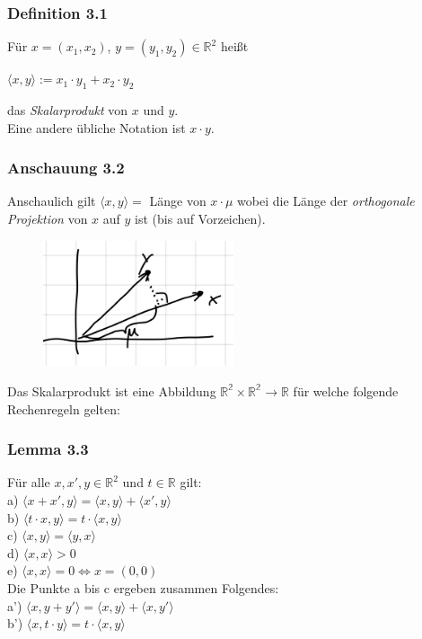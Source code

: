 \documentclass{article}
\begin{document}
\subsubsection*{Definition 3.1}
Für $x=(x_1, x_2)$, $y=(y_1, y_2) \in \mathbb{R}^2$ heißt \\
\begin{center}
    $\langle x,y \rangle := x_1 \cdot y_1 + x_2 \cdot y_2$
\end{center}
das \textit{Skalarprodukt} von $x$ und $y$. \\
Eine andere übliche Notation ist $x \cdot y$. \\

\subsubsection*{Anschauung 3.2}
Anschaulich gilt $\langle x,y \rangle = $ Länge von $x \cdot \mu$ wobei die Länge der \textit{orthogonale Projektion} von $x$ auf $y$ ist (bis auf Vorzeichen). \\

\begin{figure}[h]
    \centering
    \includegraphics[width=0.5\textwidth]{Images/3.2.jpeg}
    \caption{}
\end{figure}

Das Skalarprodukt ist eine Abbildung $\mathbb{R^2} \times \mathbb{R^2} \rightarrow \mathbb{R}$ für welche folgende Rechenregeln gelten: \\
\subsubsection*{Lemma 3.3}
Für alle $x, x', y \in \mathbb{R}^2$ und $t \in \mathbb{R}$ gilt: \\
a) $\langle x + x', y \rangle = \langle x,y \rangle + \langle x',y \rangle$ \\
b) $\langle t \cdot x, y \rangle = t \cdot \langle x,y \rangle$ \\
c) $\langle x,y \rangle = \langle y,x \rangle$ \\
d) $\langle x,x \rangle > 0$ \\
e) $\langle x,x \rangle = 0 \Leftrightarrow x = (0,0)$ \\
Die Punkte a bis c ergeben zusammen Folgendes: \\
a') $\langle x, y+y' \rangle = \langle x,y \rangle + \langle x,y' \rangle$ \\
b') $\langle x, t \cdot y \rangle = t \cdot \langle x,y \rangle$ \\
\\
\end{document}
